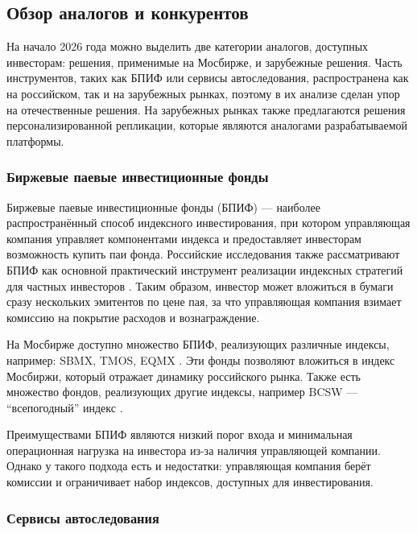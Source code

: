 \documentclass[14pt]{gost-7-32}
\begin{document}
\subsection{Обзор аналогов и конкурентов}

На начало 2026 года можно выделить две категории аналогов, доступных инвесторам: решения, применимые на Мосбирже, и зарубежные решения. Часть инструментов, таких как БПИФ или сервисы автоследования, распространена как на российском, так и на зарубежных рынках, поэтому в их анализе сделан упор на отечественные решения. На зарубежных рынках также предлагаются решения персонализированной репликации, которые являются аналогами разрабатываемой платформы.

\subsubsection{Биржевые паевые инвестиционные фонды}

Биржевые паевые инвестиционные фонды (БПИФ) --- наиболее распространённый способ индексного инвестирования, при котором управляющая компания управляет компонентами индекса и предоставляет инвесторам возможность купить паи фонда. Российские исследования также рассматривают БПИФ как основной практический инструмент реализации индексных стратегий для частных инвесторов \cite{tatyannikovIndexStrategies2023,timofeevaIndexStrategy2026}. Таким образом, инвестор может вложиться в бумаги сразу нескольких эмитентов по цене пая, за что управляющая компания взимает комиссию на покрытие расходов и вознаграждение.

На Мосбирже доступно множество БПИФ, реализующих различные индексы, например: SBMX, TMOS, EQMX \cite{sbmxMoex,tmosMoex,eqmxMoex}. Эти фонды позволяют вложиться в индекс Мосбиржи, который отражает динамику российского рынка. Также есть множество фондов, реализующих другие индексы, например BCSW --- ``всепогодный'' индекс \cite{bcswMoex}. 

Преимуществами БПИФ являются низкий порог входа и минимальная операционная нагрузка на инвестора из-за наличия управляющей компании. Однако у такого подхода есть и недостатки: управляющая компания берёт комиссии \cite{sbmxKeyInformationDocument} и ограничивает набор индексов, доступных для инвестирования.



\subsubsection{Сервисы автоследования}
\end{document}
